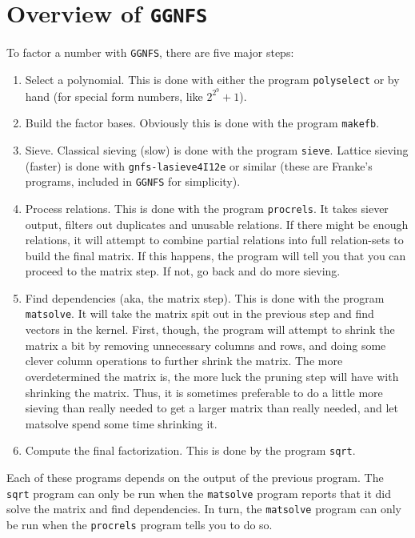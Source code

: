 \documentclass[12pt]{article}
\begin{document}
\section{Overview of {\tt GGNFS}}
  To factor a number with {\tt GGNFS}, there are five major 
  steps:
  \begin{enumerate}
    \item
      Select a polynomial. This is done with either the
      program {\tt polyselect} or by hand (for special form
      numbers, like $2^{2^{9}}+1$).
    \item
      Build the factor bases. Obviously this is done with 
      the program {\tt makefb}. 
    \item
      Sieve. Classical sieving (slow) is done with the program
      {\tt sieve}. Lattice sieving (faster)
      is done with {\tt gnfs-lasieve4I12e} or similar (these
      are Franke's programs, included in {\tt GGNFS} for simplicity).
    \item
      Process relations. This is done with the program {\tt procrels}.
      It takes siever output, filters out duplicates and unusable
      relations. If there might be enough relations, it will
      attempt to combine partial relations into full relation-sets
      to build the final matrix. If this happens, the program will
      tell you that you can proceed to the matrix step. If not,
      go back and do more sieving.
    \item
      Find dependencies (aka, the matrix step). This is done
      with the program {\tt matsolve}. It will take the matrix
      spit out in the previous step and find vectors in the kernel.
      First, though, the program will attempt to shrink the matrix
      a bit by removing unnecessary columns and rows, and doing
      some clever column operations to further shrink the matrix.
      The more overdetermined the matrix is, the more luck the
      pruning step will have with shrinking the matrix. Thus, it
      is sometimes preferable to do a little more sieving than
      really needed to get a larger matrix than really needed,
      and let matsolve spend some time shrinking it.
    \item
      Compute the final factorization. This is done by the program
      {\tt sqrt}.
  \end{enumerate}
  Each of these programs depends on the output of the previous program.
  The {\tt sqrt} program can only be run when the {\tt matsolve}
  program reports that it did solve the matrix and find dependencies.
  In turn, the {\tt matsolve} program can only be run when the
  {\tt procrels} program tells you to do so.
\end{document}
